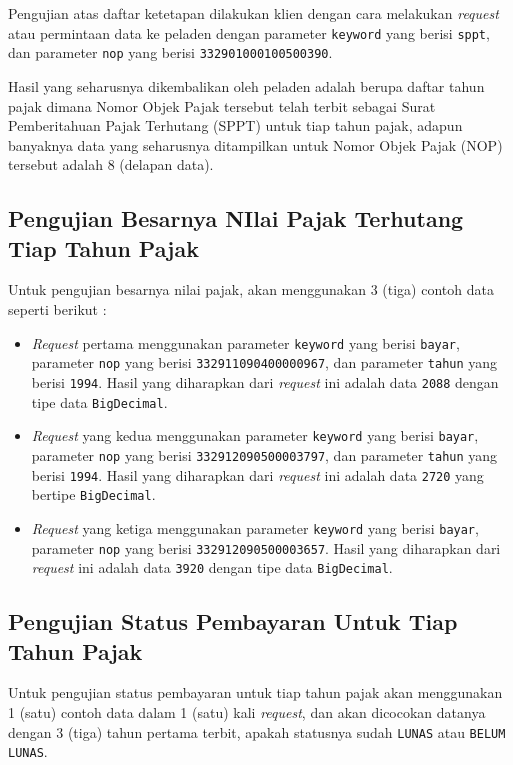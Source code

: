 Pengujian atas daftar ketetapan dilakukan klien dengan cara melakukan \textit{request} atau permintaan data ke peladen dengan parameter \texttt{keyword} yang berisi \texttt{sppt}, dan parameter \texttt{nop} yang berisi \texttt{332901000100500390}.

Hasil yang seharusnya dikembalikan oleh peladen adalah berupa daftar tahun pajak dimana Nomor Objek Pajak tersebut telah terbit sebagai Surat Pemberitahuan Pajak Terhutang (SPPT) untuk tiap tahun pajak, adapun banyaknya data yang seharusnya ditampilkan untuk Nomor Objek Pajak (NOP) tersebut adalah 8 (delapan data).

\subsection{Pengujian Besarnya NIlai Pajak Terhutang Tiap Tahun Pajak}

Untuk pengujian besarnya nilai pajak, akan menggunakan 3 (tiga) contoh data seperti berikut :

\begin{itemize}
	\item \textit{Request} pertama menggunakan parameter \texttt{keyword} yang berisi \texttt{bayar}, parameter \texttt{nop} yang berisi \texttt{332911090400000967}, dan parameter \texttt{tahun} yang berisi \texttt{1994}. Hasil yang diharapkan dari \textit{request} ini adalah data \texttt{2088} dengan tipe data \texttt{BigDecimal}.
	\item \textit{Request} yang kedua menggunakan parameter \texttt{keyword} yang berisi \texttt{bayar}, parameter \texttt{nop} yang berisi \texttt{332912090500003797}, dan parameter \texttt{tahun} yang berisi \texttt{1994}. Hasil yang diharapkan dari \textit{request} ini adalah data \texttt{2720} yang bertipe \texttt{BigDecimal}.
	\item \textit{Request} yang ketiga menggunakan parameter \texttt{keyword} yang berisi \texttt{bayar}, parameter \texttt{nop} yang berisi \texttt{332912090500003657}. Hasil yang diharapkan dari \textit{request} ini adalah data \texttt{3920} dengan tipe data \texttt{BigDecimal}.
\end{itemize}

\subsection{Pengujian Status Pembayaran Untuk Tiap Tahun Pajak}

Untuk pengujian status pembayaran untuk tiap tahun pajak akan menggunakan 1 (satu) contoh data dalam 1 (satu) kali \textit{request}, dan akan dicocokan datanya dengan 3 (tiga) tahun pertama terbit, apakah statusnya sudah \texttt{LUNAS} atau \texttt{BELUM LUNAS}.

